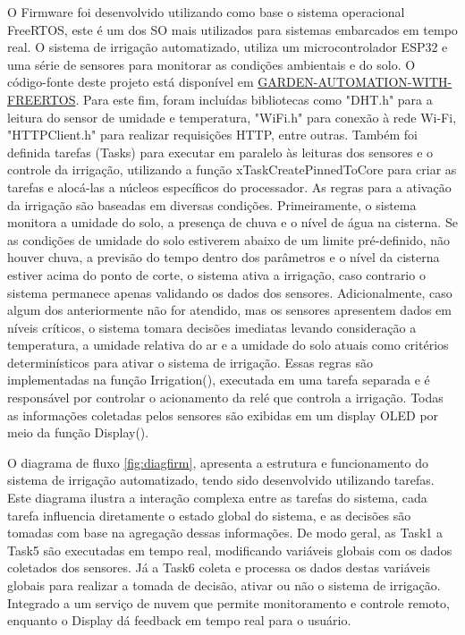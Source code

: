\documentclass[%
  article,%
  a4paper,%
  12pt,%
  fleqn,%
  oneside,%
  chapter = TITLE,%
  section = TITLE,%
]{abntex2}
\begin{document}
O Firmware foi desenvolvido utilizando como base o sistema operacional FreeRTOS, este é um dos SO mais utilizados para sistemas embarcados em tempo real. O sistema de irrigação automatizado, utiliza um microcontrolador ESP32 e uma série de sensores para monitorar as condições ambientais e do solo. O código-fonte deste projeto está disponível em  \href{https://github.com/Samuelsyspro/-GARDEN-AUTOMATION-WITH-FREERTOS.git}{GARDEN-AUTOMATION-WITH-FREERTOS}. Para este fim, foram incluídas bibliotecas como "DHT.h" para a leitura do sensor de umidade e temperatura, "WiFi.h" para conexão à rede Wi-Fi, "HTTPClient.h" para realizar requisições HTTP, entre outras. Também foi definida tarefas (Tasks) para executar em paralelo às leituras dos sensores e o controle da irrigação, utilizando a função xTaskCreatePinnedToCore para criar as tarefas e alocá-las a núcleos específicos do processador.
As regras para a ativação da irrigação são baseadas em diversas condições. Primeiramente, o sistema monitora a umidade do solo, a presença de chuva e o nível de água na cisterna. Se as condições de umidade do solo estiverem abaixo de um limite pré-definido, não houver chuva, a previsão do tempo dentro dos parâmetros e o nível da cisterna estiver acima do ponto de corte, o sistema ativa a irrigação, caso contrario o sistema permanece apenas validando os dados dos sensores. Adicionalmente, caso algum dos  anteriormente não for atendido, mas os sensores apresentem dados em níveis críticos, o sistema tomara decisões imediatas levando consideração a temperatura, a umidade relativa do ar e a umidade do solo atuais como critérios determinísticos para ativar o sistema de irrigação. Essas regras são implementadas na função Irrigation(), executada em uma tarefa separada e é responsável por controlar o acionamento da relé que controla a irrigação. Todas as informações coletadas pelos sensores são exibidas em um display OLED por meio da função Display().


O diagrama de fluxo \cref{fig:diagfirm}, apresenta a estrutura e funcionamento do sistema de irrigação automatizado, tendo sido desenvolvido utilizando tarefas. Este diagrama ilustra a interação complexa entre as tarefas do sistema, cada tarefa influencia diretamente o estado global do sistema, e as decisões são tomadas com base na agregação dessas informações. De modo geral, as Task1 a Task5 são executadas em tempo real, modificando variáveis globais com os dados coletados dos sensores. Já a Task6 coleta e processa os dados destas variáveis globais para realizar a tomada de decisão, ativar ou não o sistema de irrigação. Integrado a um serviço de nuvem que permite monitoramento e controle remoto, enquanto o Display dá feedback em tempo real para o usuário.
\end{document}
